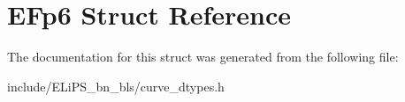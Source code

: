\hypertarget{struct_e_fp6}{}\section{E\+Fp6 Struct Reference}
\label{struct_e_fp6}


The documentation for this struct was generated from the following file\+:\begin{DoxyCompactItemize}
\item 
include/\+E\+Li\+P\+S\+\_\+bn\+\_\+bls/curve\+\_\+dtypes.\+h\end{DoxyCompactItemize}
